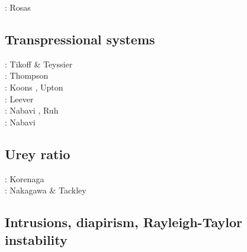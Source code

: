 \begin{scriptsize}
\twothousandfifteen: Rosas \etal \cite{rods15}
\end{scriptsize}

\subsection{Transpressional systems} 

\begin{scriptsize}
\nineteenninetyfour: Tikoff \& Teyssier \cite{tite94}\\
\nineteenninetyseven: Thompson \etal \cite{thsj97}\\
\twothousandthree: Koons \etal \cite{konc03}, Upton \etal \cite{upke03}\\
\twothousandeleven: Leever \etal \cite{legs11}\\
\twothousandseventeen: Nabavi \etal \cite{naam17}, Ruh \etal \cite{rugb17}\\
\twothousandeighteen: Nabavi \etal \cite{naam18}
\end{scriptsize}

\subsection{Urey ratio}

\begin{scriptsize}
\twothousandeight: Korenaga \cite{kore08}\\
\twothousandtwelve: Nakagawa \& Tackley \cite{nata12}
\end{scriptsize}

\subsection{Intrusions, diapirism, Rayleigh-Taylor instability}

